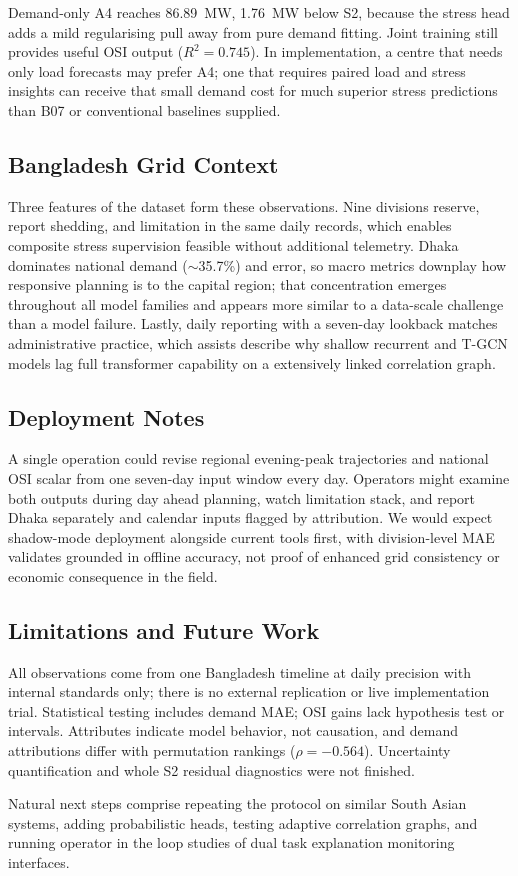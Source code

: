 Demand-only A4 reaches 86.89~MW, 1.76~MW below S2, because the stress head adds a mild regularising pull away from pure demand fitting. Joint training still provides useful OSI output ($R^2{=}0.745$). In implementation, a centre that needs only load forecasts may prefer A4; one that requires paired load and stress insights can receive that small demand cost for much superior stress predictions than B07 or conventional baselines supplied.

\subsection{Bangladesh Grid Context}

Three features of the dataset form these observations. Nine divisions reserve, report shedding, and limitation in the same daily records, which enables composite stress supervision feasible without additional telemetry. Dhaka dominates national demand ($\sim$35.7\%) and error, so macro metrics downplay how responsive planning is to the capital region; that concentration emerges throughout all model families and appears more similar to a data-scale challenge than a model failure. Lastly, daily reporting with a seven-day lookback matches administrative practice, which assists describe why shallow recurrent and T-GCN models lag full transformer capability on a extensively linked correlation graph.

\subsection{Deployment Notes}

A single operation could revise regional evening-peak trajectories and national OSI scalar from one seven-day input window every day. Operators might examine both outputs during day ahead planning, watch limitation stack, and report Dhaka separately and calendar inputs flagged by attribution. We would expect shadow-mode deployment alongside current tools first, with division-level MAE validates grounded in offline accuracy, not proof of enhanced grid consistency or economic consequence in the field.

\subsection{Limitations and Future Work}

All observations come from one Bangladesh timeline at daily precision with internal standards only; there is no external replication or live implementation trial. Statistical testing includes demand MAE; OSI gains lack hypothesis test or intervals. Attributes indicate model behavior, not causation, and demand attributions differ with permutation rankings ($\rho{=}{-}0.564$). Uncertainty quantification and whole S2 residual diagnostics were not finished.

Natural next steps comprise repeating the protocol on similar South Asian systems, adding probabilistic heads, testing adaptive correlation graphs, and running operator in the loop studies of dual task explanation monitoring interfaces.
